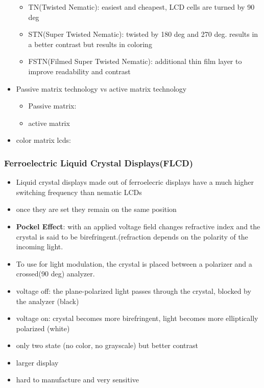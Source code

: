\documentclass{standalone}
\begin{document}
\begin{itemize}
\begin{itemize}
\item TN(Twisted Nematic): easiest and cheapest, LCD cells are turned by 90 deg
\item STN(Super Twisted Nematic): twisted by 180 deg and 270 deg. results in a better contrast but results in coloring
\item FSTN(Filmed Super Twisted Nematic): additional thin film layer to improve readability and contrast
\end{itemize}
\item Passive matrix technology vs active matrix technology
\begin{itemize}
\item Passive matrix:
\item active matrix
\end{itemize}
\item color matrix lcds:
\end{itemize}

\subsubsection*{Ferroelectric Liquid Crystal Displays(FLCD)}
\begin{itemize}
\item Liquid crystal displays made out of ferroelecric displays have a much higher switching frequency than nematic LCDs
\item once they are set they remain on the same position
\item \textbf{Pockel Effect}: with an applied voltage field changes refractive index and the crystal is said to be birefringent.(refraction depends on the polarity of the incoming light.
\item To use for light modulation, the crystal is placed between a polarizer and a crossed(90 deg) analyzer.
\item voltage off: the plane-polarized light passes through the crystal, blocked by the analyzer (black)
\item voltage on: crystal becomes more birefringent, light becomes more elliptically polarized (white)
\item only two state (no color, no grayscale) but better contrast 
\item larger display 
\item hard to manufacture and very sensitive
\end{itemize}
\end{document}
